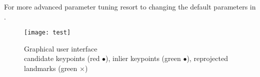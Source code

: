 For more advanced parameter tuning resort to changing the default parameters in .

\begin{figure}[ht]
	\centering
	\texttt{[image: test]}
	\captionsetup{justification=centering}
	\caption{Graphical user interface \\candidate keypoints (red $\bullet$), inlier keypoints (green $\bullet$), reprojected landmarks (green $\times$)}
	\label{img_gui}
\end{figure}


\clearpage{\pagestyle{plain}\cleardoublepage}

\clearpage{\pagestyle{plain}\cleardoublepage}